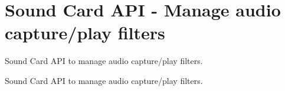 \section{Sound Card A\+PI -\/ Manage audio capture/play filters}
\label{group__mediastreamer2__soundcard}


Sound Card A\+PI to manage audio capture/play filters.  


Sound Card A\+PI to manage audio capture/play filters. 

